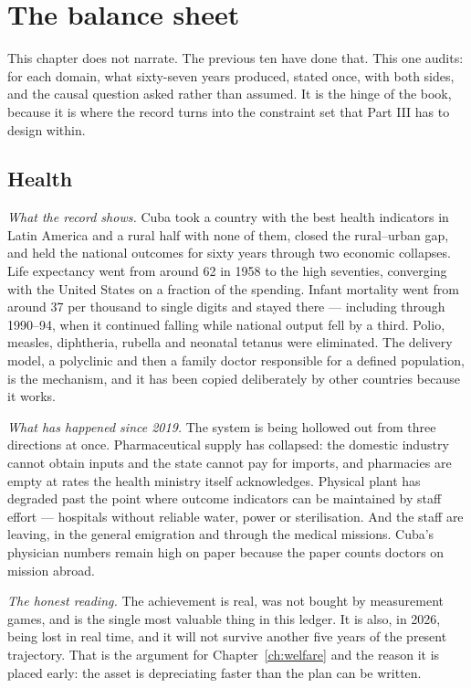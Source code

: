 \chapter{The balance sheet}
\label{ch:ledgerch}

This chapter does not narrate. The previous ten have done that. This one audits:
for each domain, what sixty-seven years produced, stated once, with both sides,
and the causal question asked rather than assumed. It is the hinge of the book,
because it is where the record turns into the constraint set that Part III has
to design within.

\section{Health}

\emph{What the record shows.} Cuba took a country with the best health
indicators in Latin America and a rural half with none of them, closed the
rural--urban gap, and held the national outcomes for sixty years through two
economic collapses. Life expectancy went from around 62 in 1958 to the high
seventies, converging with the United States on a fraction of the spending.
Infant mortality went from around 37 per thousand to single digits and stayed
there --- including through 1990--94, when it continued falling while national
output fell by a third. Polio, measles, diphtheria, rubella and neonatal tetanus
were eliminated. The delivery model, a polyclinic and then a family doctor
responsible for a defined population, is the mechanism, and it has been copied
deliberately by other countries because it works.

\emph{What has happened since 2019.} The system is being hollowed out from three
directions at once. Pharmaceutical supply has collapsed: the domestic industry
cannot obtain inputs and the state cannot pay for imports, and pharmacies are
empty at rates the health ministry itself acknowledges. Physical plant has
degraded past the point where outcome indicators can be maintained by staff
effort --- hospitals without reliable water, power or sterilisation. And the
staff are leaving, in the general emigration and through the medical missions.
Cuba's physician numbers remain high on paper because the paper counts doctors
on mission abroad.

\emph{The honest reading.} The achievement is real, was not bought by
measurement games, and is the single most valuable thing in this ledger. It is
also, in 2026, being lost in real time, and it will not survive another five
years of the present trajectory. That is the argument for
Chapter~\ref{ch:welfare} and the reason it is placed early: the asset is
depreciating faster than the plan can be written.

